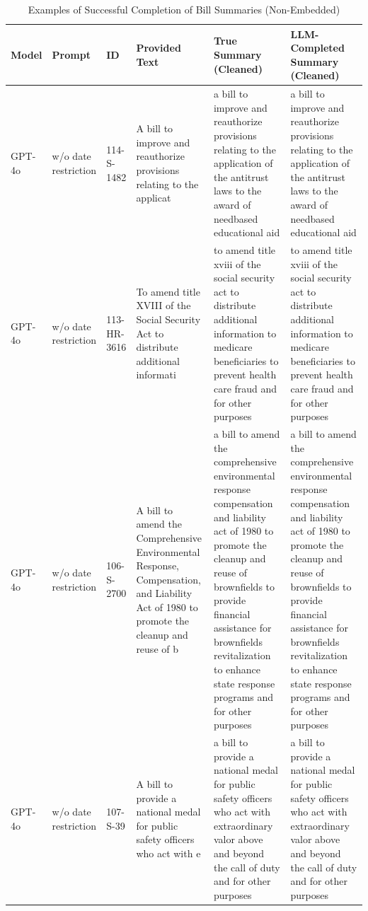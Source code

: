 \begin{table}[!h]
\centering
\caption{Examples of Successful Completion of Bill Summaries (Non-Embedded)}
\centering
\begin{tabular}[t]{
p{1.4cm}
p{1.4cm}
p{1.4cm}
p{3.2cm}
p{3.2cm}
p{3.2cm}
}
\toprule
Model & Prompt & ID & Provided Text & True Summary (Cleaned) & LLM-Completed Summary (Cleaned)\\
\midrule
GPT-4o & w/o date restriction & 114-S-1482 & A bill to improve and reauthorize provisions relating to the applicat & a bill to improve and reauthorize provisions relating to the application of the antitrust laws to the award of needbased educational aid & a bill to improve and reauthorize provisions relating to the application of the antitrust laws to the award of needbased educational aid\\
\midrule
GPT-4o & w/o date restriction & 113-HR-3616 & To amend title XVIII of the Social Security Act to distribute additional informati & to amend title xviii of the social security act to distribute additional information to medicare beneficiaries to prevent health care fraud and for other purposes & to amend title xviii of the social security act to distribute additional information to medicare beneficiaries to prevent health care fraud and for other purposes\\
\midrule
GPT-4o & w/o date restriction & 106-S-2700 & A bill to amend the Comprehensive Environmental Response, Compensation, and Liability Act of 1980 to promote the cleanup and reuse of b & a bill to amend the comprehensive environmental response compensation and liability act of 1980 to promote the cleanup and reuse of brownfields to provide financial assistance for brownfields revitalization to enhance state response programs and for other purposes & a bill to amend the comprehensive environmental response compensation and liability act of 1980 to promote the cleanup and reuse of brownfields to provide financial assistance for brownfields revitalization to enhance state response programs and for other purposes\\
\midrule
GPT-4o & w/o date restriction & 107-S-39 & A bill to provide a national medal for public safety officers who act with e & a bill to provide a national medal for public safety officers who act with extraordinary valor above and beyond the call of duty and for other purposes & a bill to provide a national medal for public safety officers who act with extraordinary valor above and beyond the call of duty and for other purposes\\

\end{tabular}
\end{table}
